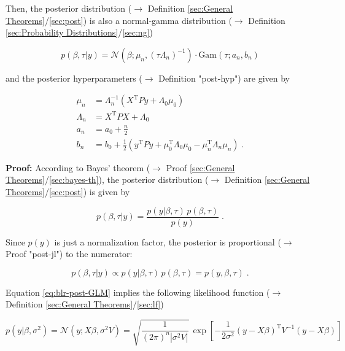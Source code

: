 \documentclass[a4paper,12pt]{book}
\begin{document}
Then, the posterior distribution ($\rightarrow$ Definition \ref{sec:General Theorems}/\ref{sec:post}) is also a normal-gamma distribution ($\rightarrow$ Definition \ref{sec:Probability Distributions}/\ref{sec:ng})

\begin{equation} \label{eq:blr-post-GLM-NG-post}
p(\beta,\tau|y) = \mathcal{N}(\beta; \mu_n, (\tau \Lambda_n)^{-1}) \cdot \mathrm{Gam}(\tau; a_n, b_n)
\end{equation}

and the posterior hyperparameters ($\rightarrow$ Definition "post-hyp") are given by

\begin{equation} \label{eq:blr-post-GLM-NG-post-par}
\begin{split}
\mu_n &= \Lambda_n^{-1} (X^\mathrm{T} P y + \Lambda_0 \mu_0) \\
\Lambda_n &= X^\mathrm{T} P X + \Lambda_0 \\
a_n &= a_0 + \frac{n}{2} \\
b_n &= b_0 + \frac{1}{2} (y^\mathrm{T} P y + \mu_0^\mathrm{T} \Lambda_0 \mu_0 - \mu_n^\mathrm{T} \Lambda_n \mu_n) \; .
\end{split}
\end{equation}


\vspace{1em}
\textbf{Proof:} According to Bayes' theorem ($\rightarrow$ Proof \ref{sec:General Theorems}/\ref{sec:bayes-th}), the posterior distribution ($\rightarrow$ Definition \ref{sec:General Theorems}/\ref{sec:post}) is given by

\begin{equation} \label{eq:blr-post-GLM-NG-BT}
p(\beta,\tau|y) = \frac{p(y|\beta,\tau) \, p(\beta,\tau)}{p(y)} \; .
\end{equation}

Since $p(y)$ is just a normalization factor, the posterior is proportional ($\rightarrow$ Proof "post-jl") to the numerator:

\begin{equation} \label{eq:blr-post-GLM-NG-post-JL}
p(\beta,\tau|y) \propto p(y|\beta,\tau) \, p(\beta,\tau) = p(y,\beta,\tau) \; .
\end{equation}

Equation \eqref{eq:blr-post-GLM} implies the following likelihood function ($\rightarrow$ Definition \ref{sec:General Theorems}/\ref{sec:lf})

\begin{equation} \label{eq:blr-post-GLM-LF-class}
p(y|\beta,\sigma^2) = \mathcal{N}(y; X \beta, \sigma^2 V) = \sqrt{\frac{1}{(2 \pi)^n |\sigma^2 V|}} \, \exp\left[ -\frac{1}{2 \sigma^2} (y-X\beta)^\mathrm{T} V^{-1} (y-X\beta) \right]
\end{equation}
\end{document}

